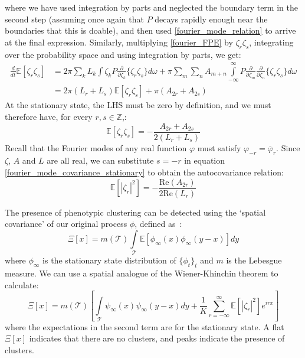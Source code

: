 where we have used integration by parts and neglected the boundary term in the second step (assuming once again that $P$ decays rapidly enough near the boundaries that this is doable), and then used \eqref{fourier_mode_relation} to arrive at the final expression. Similarly, multiplying \eqref{fourier_FPE} by $\zeta_r\zeta_s$, integrating over the probability space and using integration by parts, we get:
\begin{align}
\frac{d}{dt}\mathbb{E}[\zeta_r\zeta_s] &= 2\pi \sum\limits_{k}L_{k}\int\zeta_kP\frac{\partial}{\partial \zeta_k}\{\zeta_r\zeta_s\}d\omega + \pi\sum\limits_{m}\sum\limits_{n}A_{m+n}\int\limits_{-\infty}^{\infty}P\frac{\partial}{\partial \zeta_m}\frac{\partial}{\partial \zeta_{n}}\{\zeta_r\zeta_s\}d\omega\nonumber\\
&= 2\pi (L_{r} + L_{s})\mathbb{E}[\zeta_r\zeta_s] + \pi (A_{2r}+A_{2s})\label{fourier_mode_covariance}
\end{align}
At the stationary state, the LHS must be zero by definition, and we must therefore have, for every $r,s \in \mathbb{Z}$,:
\begin{equation}
\label{fourier_mode_covariance_stationary}
\mathbb{E}[\zeta_r\zeta_s] = -   \frac{A_{2r}+A_{2s}}{2(L_{r}+L_{s})}
\end{equation}
Recall that the Fourier modes of any real function $\varphi$ must satisfy $\varphi_{-r} = \overline{\varphi}_r$. Since $\zeta$, $A$ and $L$ are all real, we can substitute $s=-r$ in equation \eqref{fourier_mode_covariance_stationary} to obtain the autocovariance relation:
\begin{equation}
\label{fourier_mode_autocovariance}
\mathbb{E}[|\zeta_r|^2] =- \frac{\mathrm{Re}(A_{2r})}{2\mathrm{Re}(L_{r})}
\end{equation}

The presence of phenotypic clustering can be detected using the `spatial covariance' of our original process $\phi$, defined as~\citep{rogers_demographic_2012}:
\begin{equation}
\label{spatial_covariance_defn}
\Xi[x] = m(\mathcal{T})\int\limits_{\mathcal{T}}\mathbb{E}[\phi_{\infty}(x)\phi_{\infty}(y-x)]dy
\end{equation}
where $\phi_{\infty}$ is the stationary state distribution of $\{\phi_t\}_{t}$ and $m$ is the Lebesgue measure. We can use a spatial analogue of the Wiener-Khinchin theorem to calculate:
\begin{equation}
\label{spatial_covariance_zeta}
\Xi[x] = m(\mathcal{T})\left[\int\limits_{\mathcal{T}}\psi_{\infty}(x)\psi_{\infty}(y-x)dy + \frac{1}{K}\sum\limits_{r=-\infty}^{\infty}\mathbb{E}[|\zeta_r|^2]e^{irx}\right]
\end{equation}
where the expectations in the second term are for the stationary state. A flat $\Xi[x]$ indicates that there are no clusters, and peaks indicate the presence of clusters.

